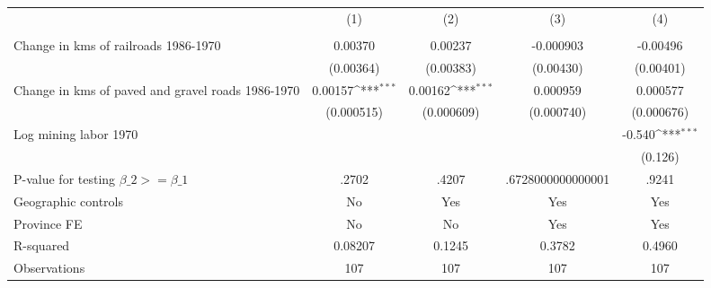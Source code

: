 {
\def\sym#1{\ifmmode^{#1}\else\(^{#1}\)\fi}
\begin{tabular}{l*{4}{c}}
\hline\hline
                &\multicolumn{1}{c}{(1)}&\multicolumn{1}{c}{(2)}&\multicolumn{1}{c}{(3)}&\multicolumn{1}{c}{(4)}\\
                &\multicolumn{1}{c}{}&\multicolumn{1}{c}{}&\multicolumn{1}{c}{}&\multicolumn{1}{c}{}\\
\hline
Change in kms of railroads 1986-1970&  0.00370         &  0.00237         &-0.000903         & -0.00496         \\
                &(0.00364)         &(0.00383)         &(0.00430)         &(0.00401)         \\
[1em]
Change in kms of paved and gravel roads 1986-1970&  0.00157\sym{***}&  0.00162\sym{***}& 0.000959         & 0.000577         \\
                &(0.000515)         &(0.000609)         &(0.000740)         &(0.000676)         \\
[1em]
Log mining labor 1970&                  &                  &                  &   -0.540\sym{***}\\
                &                  &                  &                  &  (0.126)         \\
\hline
P-value for testing $\beta\_{2} >= \beta\_{1}$&    .2702         &    .4207         &.6728000000000001         &    .9241         \\
Geographic controls&       No         &      Yes         &      Yes         &      Yes         \\
Province FE     &       No         &       No         &      Yes         &      Yes         \\
R-squared       &  0.08207         &   0.1245         &   0.3782         &   0.4960         \\
Observations    &      107         &      107         &      107         &      107         \\
\hline\hline
\end{tabular}
}
